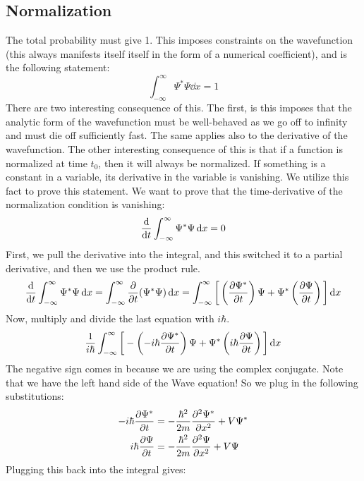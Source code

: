 \subsection{Normalization}
The total probability must give 1. This imposes constraints on the wavefunction (this always manifests itself itself in the form of a numerical coefficient), and is the following statement:
\begin{equation*}
  \boxed{\int_{-\infty}^{\infty}\Psi^*\Psi\dd{x}=1}
\end{equation*}
There are two interesting consequence of this. The first, is this imposes that the analytic form of the wavefunction must be well-behaved as we go off to infinity and must die off sufficiently fast. The same applies also to the derivative of the wavefunction. The other interesting consequence of this is that if a function is normalized at time $t_{0}$, then it will always be normalized. If something is a constant in a variable, its derivative in the variable is vanishing. We utilize this fact to prove this statement. We want to prove that the time-derivative of the normalization condition is vanishing:
\begin{equation*}
  \dv{t}\int_{-\infty}^{\infty}\Psi^*\Psi\dd{x} = 0
\end{equation*}
First, we pull the derivative into the integral, and this switched it to a partial derivative, and then we use the product rule.
\begin{equation*}
  \dv{t}\int_{-\infty}^{\infty}\Psi^*\Psi\dd{x} = \int_{-\infty}^{\infty}\pdv{t}(\Psi^*\Psi)\dd{x} = \int_{-\infty}^{\infty}\bigg[\left(\pdv{\Psi^*}{t}\right)\Psi + \Psi^*\left(\pdv{\Psi}{t}\right) \bigg]\dd{x}
\end{equation*}
Now, multiply and divide the last equation with $i\hbar$.
\begin{equation*}
   \frac{1}{i\hbar} \int_{-\infty}^{\infty}\bigg[-\left(-i\hbar\pdv{\Psi^*}{t}\right)\Psi + \Psi^*\left(i\hbar\pdv{\Psi}{t}\right) \bigg]\dd{x}
\end{equation*}
The negative sign comes in because we are using the complex conjugate. Note that we have the left hand side of the Wave equation! So we plug in the following substitutions:
\begin{align*}
    -i\hbar\pdv{\Psi^*}{t} & = -\dfrac{\hbar^2}{2m}\pdv[2]{\Psi^*}{x}+V\Psi^* \\
    i\hbar\pdv{\Psi}{t} & = -\dfrac{\hbar^2}{2m}\pdv[2]{\Psi}{x}+V\Psi
\end{align*}
Plugging this back into the integral gives:
